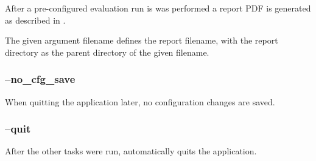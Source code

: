 After a pre-configured evaluation run is was performed a report PDF is generated as described in .

The given argument filename defines the report filename, with the report directory as the parent directory of the given filename.

\subsubsection{--no\_cfg\_save}

When quitting the application later, no configuration changes are saved.

\subsubsection{--quit}

After the other tasks were run, automatically quits the application.

